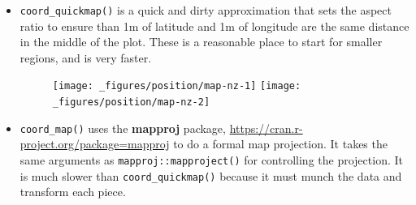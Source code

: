 \begin{itemize}
\item
  \texttt{coord\_quickmap()} is a quick and dirty approximation that
  sets the aspect ratio to ensure than 1m of latitude and 1m of
  longitude are the same distance in the middle of the plot. These is a
  reasonable place to start for smaller regions, and is very faster.

\begin{Shaded}
\begin{Highlighting}[]
\StringTok{ }\NormalTok{(}\NormalTok{(}\NormalTok{), } 
\StringTok{  }\NormalTok{(} \NormalTok{, } \NormalTok{) +}
\StringTok{  }\NormalTok{(}\NormalTok{) +}\StringTok{ }\NormalTok{(}\NormalTok{)}

\StringTok{ }\NormalTok{()}
\end{Highlighting}
\end{Shaded}

  \begin{figure}[H]
    \centering
    \texttt{[image: \_figures/position/map-nz-1]}%
    \texttt{[image: \_figures/position/map-nz-2]}
  \end{figure}
\item
  \texttt{coord\_map()} uses the \textbf{mapproj} package,
  \url{https://cran.r-project.org/package=mapproj} to do a formal map
  projection. It takes the same arguments as
  \texttt{mapproj::mapproject()} for controlling the projection. It is
  much slower than \texttt{coord\_quickmap()} because it must munch the
  data and transform each piece.

\begin{Shaded}
\begin{Highlighting}[]
\StringTok{ }\NormalTok{(}\NormalTok{)}
\StringTok{ } 
\StringTok{  }\NormalTok{() +}
\StringTok{  }\NormalTok{(}\NormalTok{, } \NormalTok{(-}\NormalTok{:}\NormalTok{) *}\StringTok{ }\NormalTok{, } \NormalTok{) +}
\StringTok{  }\NormalTok{(}\NormalTok{, } \NormalTok{(-}\NormalTok{:}\NormalTok{) *}\StringTok{ }\NormalTok{, } \NormalTok{)}


\end{Highlighting}
\end{Shaded}
\end{itemize}
